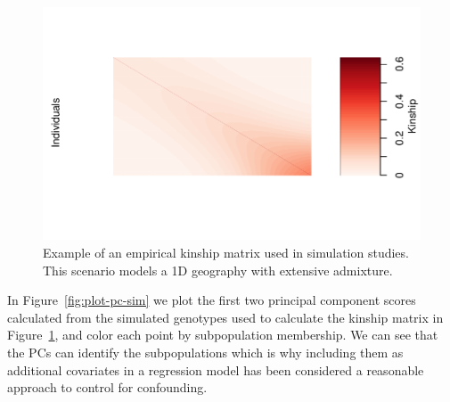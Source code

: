 \documentclass[12pt,letter]{article}\usepackage[]{graphicx}\usepackage[]{color}
\newenvironment{knitrout}{}{} %
\begin{document}
\begin{knitrout}\scriptsize
{}\color{fgcolor}\begin{figure}[H]

{\centering \includegraphics[width=1\linewidth]{figure/plot-kinship-sim-1} 

}

\caption[Example of an empirical kinship matrix used in simulation studies]{Example of an empirical kinship matrix used in simulation studies. This scenario models a 1D geography with extensive admixture.}\label{fig:plot-kinship-sim}
\end{figure}


\end{knitrout}

In Figure~\ref{fig:plot-pc-sim} we plot the first two principal component scores calculated from the simulated genotypes used to calculate the kinship matrix in Figure~\ref{fig:plot-kinship-sim}, and color each point by subpopulation membership. We can see that the PCs can identify the subpopulations which is why including them as additional covariates in a regression model has been considered a reasonable approach to control for confounding.
\end{document}
